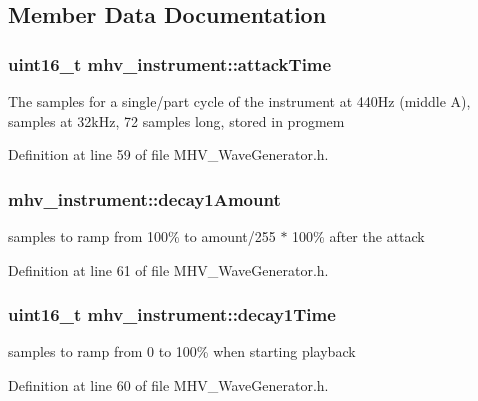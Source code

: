 \subsection{\-Member \-Data \-Documentation}
\hypertarget{structmhv__instrument_a9b85066674551959ac0ef4d57bedfcb5}{
\subsubsection[{attack\-Time}]{\setlength{\rightskip}{0pt plus 5cm}uint16\-\_\-t {\bf mhv\-\_\-instrument\-::attack\-Time}}}
\label{structmhv__instrument_a9b85066674551959ac0ef4d57bedfcb5}
\-The samples for a single/part cycle of the instrument at 440\-Hz (middle \-A), samples at 32k\-Hz, 72 samples long, stored in progmem 

\-Definition at line 59 of file \-M\-H\-V\-\_\-\-Wave\-Generator.\-h.

\hypertarget{structmhv__instrument_a922f4e32b9e9c1b7e685124845fed1ad}{
\subsubsection[{decay1\-Amount}]{ {\bf mhv\-\_\-instrument\-::decay1\-Amount}}}
\label{structmhv__instrument_a922f4e32b9e9c1b7e685124845fed1ad}
samples to ramp from 100\% to amount/255 $\ast$ 100\% after the attack 

\-Definition at line 61 of file \-M\-H\-V\-\_\-\-Wave\-Generator.\-h.

\hypertarget{structmhv__instrument_a8ba9f75ad91b531d497d18bad6351d9d}{
\subsubsection[{decay1\-Time}]{\setlength{\rightskip}{0pt plus 5cm}uint16\-\_\-t {\bf mhv\-\_\-instrument\-::decay1\-Time}}}
\label{structmhv__instrument_a8ba9f75ad91b531d497d18bad6351d9d}
samples to ramp from 0 to 100\% when starting playback 

\-Definition at line 60 of file \-M\-H\-V\-\_\-\-Wave\-Generator.\-h.

